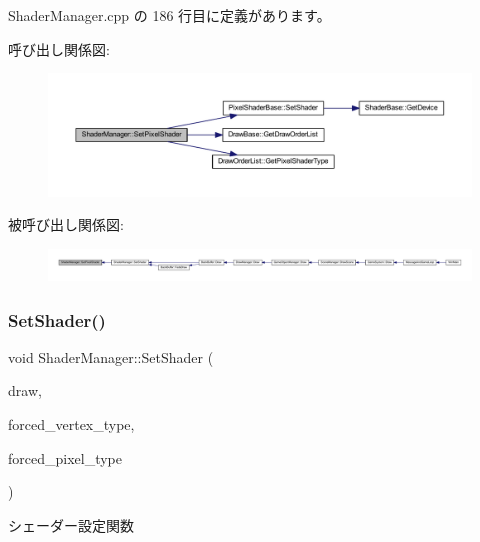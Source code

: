  Shader\+Manager.\+cpp の 186 行目に定義があります。

呼び出し関係図\+:
\nopagebreak
\begin{figure}[H]
\begin{center}
\leavevmode
\includegraphics[width=350pt]{class_shader_manager_a6c954293001a33fafff216ff719618d5_cgraph}
\end{center}
\end{figure}
被呼び出し関係図\+:
\nopagebreak
\begin{figure}[H]
\begin{center}
\leavevmode
\includegraphics[width=350pt]{class_shader_manager_a6c954293001a33fafff216ff719618d5_icgraph}
\end{center}
\end{figure}
\mbox{\label{class_shader_manager_ad2caed4ae50c1ca784151d0f9e50c381}} 
\subsubsection{\texorpdfstring{Set\+Shader()}{SetShader()}}
{\footnotesize\ttfamily void Shader\+Manager\+::\+Set\+Shader (\begin{DoxyParamCaption}\item[{\mbox{\hyperlink{class_draw_base}{Draw\+Base}} $\ast$}]{draw,  }\item[{\mbox{\hyperlink{class_shader_manager_a9b51e49d70eb3cc58f6d1f3994e8cfbd}{Vertex\+Shader\+Type}}}]{forced\+\_\+vertex\+\_\+type,  }\item[{\mbox{\hyperlink{class_shader_manager_a7d15d773b3c6a99dd7086c45c8b0be5f}{Pixel\+Shader\+Type}}}]{forced\+\_\+pixel\+\_\+type }\end{DoxyParamCaption})}



シェーダー設定関数 


